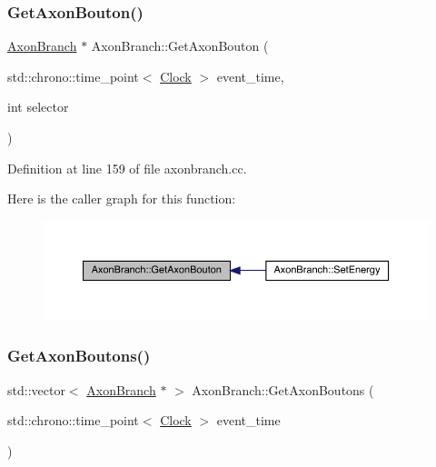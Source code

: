 \subsubsection{\texorpdfstring{Get\+Axon\+Bouton()}{GetAxonBouton()}}
{\footnotesize\ttfamily \hyperlink{class_axon_branch}{Axon\+Branch} $\ast$ Axon\+Branch\+::\+Get\+Axon\+Bouton (\begin{DoxyParamCaption}\item[{std\+::chrono\+::time\+\_\+point$<$ \hyperlink{universe_8h_a0ef8d951d1ca5ab3cfaf7ab4c7a6fd80}{Clock} $>$}]{event\+\_\+time,  }\item[{int}]{selector }\end{DoxyParamCaption})}



Definition at line 159 of file axonbranch.\+cc.

Here is the caller graph for this function\+:
\nopagebreak
\begin{figure}[H]
\begin{center}
\leavevmode
\includegraphics[width=350pt]{class_axon_branch_a6fa6eea91e72fd142f3d691f7ca4c99a_icgraph}
\end{center}
\end{figure}
\mbox{\label{class_axon_branch_aafadba57924686a8087c7f7758889045}} 
\subsubsection{\texorpdfstring{Get\+Axon\+Boutons()}{GetAxonBoutons()}}
{\footnotesize\ttfamily std\+::vector$<$ \hyperlink{class_axon_branch}{Axon\+Branch} $\ast$ $>$ Axon\+Branch\+::\+Get\+Axon\+Boutons (\begin{DoxyParamCaption}\item[{std\+::chrono\+::time\+\_\+point$<$ \hyperlink{universe_8h_a0ef8d951d1ca5ab3cfaf7ab4c7a6fd80}{Clock} $>$}]{event\+\_\+time }\end{DoxyParamCaption})}



